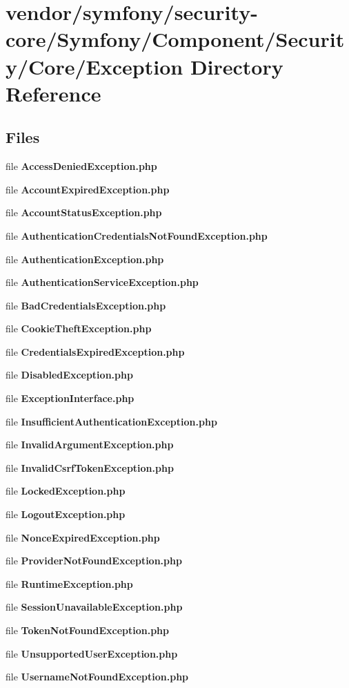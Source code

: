 \section{vendor/symfony/security-\/core/\+Symfony/\+Component/\+Security/\+Core/\+Exception Directory Reference}
\label{dir_3e7b393f27425257b42330f1e0ce83b1}
\subsection*{Files}
\begin{DoxyCompactItemize}
\item 
file {\bf Access\+Denied\+Exception.\+php}
\item 
file {\bf Account\+Expired\+Exception.\+php}
\item 
file {\bf Account\+Status\+Exception.\+php}
\item 
file {\bf Authentication\+Credentials\+Not\+Found\+Exception.\+php}
\item 
file {\bf Authentication\+Exception.\+php}
\item 
file {\bf Authentication\+Service\+Exception.\+php}
\item 
file {\bf Bad\+Credentials\+Exception.\+php}
\item 
file {\bf Cookie\+Theft\+Exception.\+php}
\item 
file {\bf Credentials\+Expired\+Exception.\+php}
\item 
file {\bf Disabled\+Exception.\+php}
\item 
file {\bf Exception\+Interface.\+php}
\item 
file {\bf Insufficient\+Authentication\+Exception.\+php}
\item 
file {\bf Invalid\+Argument\+Exception.\+php}
\item 
file {\bf Invalid\+Csrf\+Token\+Exception.\+php}
\item 
file {\bf Locked\+Exception.\+php}
\item 
file {\bf Logout\+Exception.\+php}
\item 
file {\bf Nonce\+Expired\+Exception.\+php}
\item 
file {\bf Provider\+Not\+Found\+Exception.\+php}
\item 
file {\bf Runtime\+Exception.\+php}
\item 
file {\bf Session\+Unavailable\+Exception.\+php}
\item 
file {\bf Token\+Not\+Found\+Exception.\+php}
\item 
file {\bf Unsupported\+User\+Exception.\+php}
\item 
file {\bf Username\+Not\+Found\+Exception.\+php}
\end{DoxyCompactItemize}
